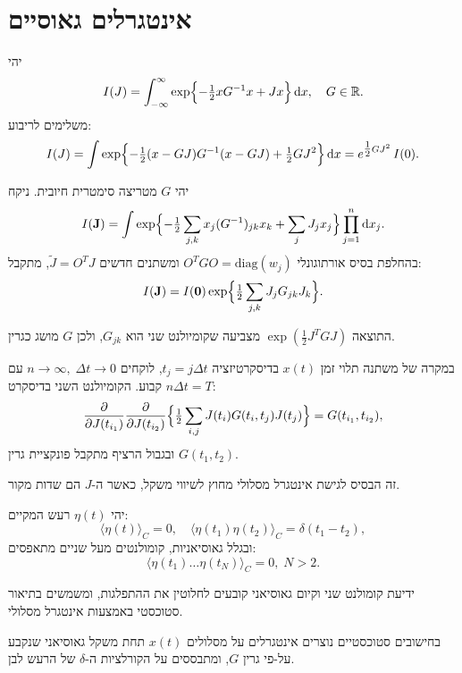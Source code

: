 \documentclass{tstextbook}
\begin{document}
\section{אינטגרלים גאוסיים}

\begin{proposition}
יהי
$$I(J) = \int_{-\infty}^{\infty} \exp\Bigl\{-\tfrac12 x G^{-1} x + J x\Bigr\}\,\mathrm{d}x,\quad G\in\mathbb{R}.
$$
משלימים לריבוע:
$$I(J) = \int \exp\Bigl\{-\tfrac12 (x - G J) G^{-1} (x - G J) + \tfrac12 G J^2 \Bigr\}\,\mathrm{d}x= e^{\tfrac12 G J^2}\,I(0).
$$

\end{proposition}
\begin{proposition}
יהי \(G\) מטריצה סימטרית חיובית. ניקח
$$I(\mathbf{J}) = \int \exp\Bigl\{ -\tfrac12 \sum_{j,k} x_j (G^{-1})_{jk} x_k + \sum_j J_j x_j \Bigr\} \prod_{j=1}^n \mathrm{d}x_j.
$$
בהחלפת בסיס אורתוגונלי \(O^T G O = \mathrm{diag}(w_j)\) ומשתנים חדשים \(\tilde J = O^T J\), מתקבל:
$$I(\mathbf{J}) = I(\mathbf{0}) \exp\Bigl\{\tfrac12 \sum_{j,k} J_j G_{jk} J_k \Bigr\}.
$$

\end{proposition}
\begin{remark}
התוצאה \(\exp(\tfrac12 J^T G J)\) מצביעה שקומיולנט שני הוא \(G_{jk}\), ולכן \(G\) מושג כגרין.

\end{remark}
\begin{proposition}
במקרה של משתנה תלוי זמן \(x(t)\) בדיסקרטיזציה \(t_j = j\Delta t\), לוקחים \(n\to\infty,\;\Delta t\to0\) עם \(n\Delta t=T\) קבוע. הקומיולנט השני בדיסקרט:
$$\frac{\partial}{\partial J(t_{i_1})}\frac{\partial}{\partial J(t_{i_2})} \Bigl\{\tfrac12 \sum_{i,j} J(t_i) G(t_i, t_j) J(t_j)\Bigr\}= G(t_{i_1},t_{i_2}),
$$
ובגבול הרציף מתקבל פונקציית גרין \(G(t_1,t_2)\).

\end{proposition}
\begin{remark}
זה הבסיס לגישת אינטגרל מסלולי מחוץ לשיווי משקל, כאשר ה-\(J\) הם שדות מקור.

\end{remark}
\begin{definition}
יהי \(\eta(t)\) רעש המקיים:
$$\langle \eta(t)\rangle_C=0,\quad \langle \eta(t_1)\eta(t_2)\rangle_C = \delta(t_1-t_2),
$$
ובגלל גאוסיאניות, קומולנטים מעל שניים מתאפסים:
$$\langle \eta(t_1)\dots \eta(t_N)\rangle_C = 0,\; N>2.
$$

\end{definition}
\begin{remark}
ידיעת קומולנט שני וקיום גאוסיאני קובעים לחלוטין את ההתפלגות, ומשמשים בתיאור סטוכסטי באמצעות אינטגרל מסלולי.

\end{remark}
\begin{remark}
בחישובים סטוכסטיים נוצרים אינטגרלים על מסלולים \(x(t)\) תחת משקל גאוסיאני שנקבע על-פי גרין \(G\), ומתבססים על הקורלציות ה-\(\delta\) של הרעש לבן.

\end{remark}
\end{document}
